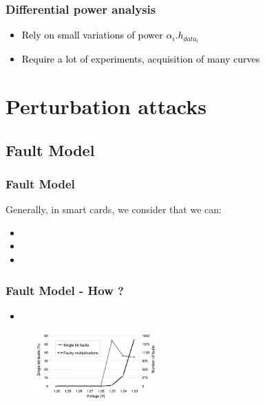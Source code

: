 \documentclass{beamer}
\begin{document}
\begin{frame}
    \frametitle{Differential power analysis}
    \begin{itemize}
        \item \textcolor{black} {Rely on small variations of power $\alpha_{i}. h_{data_{i}}$}
	\item \textcolor{black} {Require a lot of experiments, acquisition of many curves}
    \end{itemize}
\end{frame}

\section{Perturbation attacks}
    \subsection{Fault Model}

    \begin{frame}
        \frametitle{Fault Model}
            Generally, in smart cards, we consider that we can:
            \begin{itemize}
                \item {}
                \item {}
                \item {}
            \end{itemize}
    \end{frame}

    \begin{frame}
        \frametitle{Fault Model - How ?}
            \begin{itemize}
                \item {}
            \end{itemize}
            
            \begin{figure}
                \centering
                \includegraphics[width=180px]{img/power_disturbation}
            \end{figure}

    \end{frame}
\end{document}
